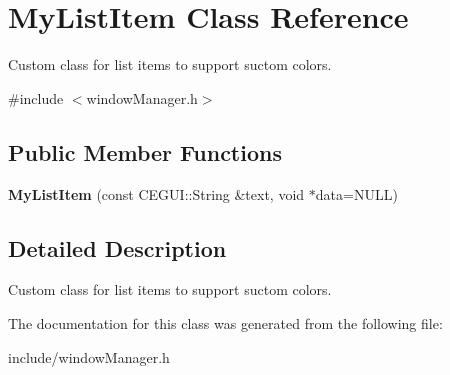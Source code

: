 \hypertarget{classMyListItem}{
\section{\-My\-List\-Item \-Class \-Reference}
\label{d9/d7a/classMyListItem}
}


\-Custom class for list items to support suctom colors.  




{\ttfamily \#include $<$window\-Manager.\-h$>$}

\subsection*{\-Public \-Member \-Functions}
\begin{DoxyCompactItemize}
\item 
\hypertarget{classMyListItem_a3d0c5c85673faf376a34e657b26d03ba}{
{\bfseries \-My\-List\-Item} (const \-C\-E\-G\-U\-I\-::\-String \&text, void $\ast$data=\-N\-U\-L\-L)}
\label{d9/d7a/classMyListItem_a3d0c5c85673faf376a34e657b26d03ba}

\end{DoxyCompactItemize}


\subsection{\-Detailed \-Description}
\-Custom class for list items to support suctom colors. 

\-The documentation for this class was generated from the following file\-:\begin{DoxyCompactItemize}
\item 
include/window\-Manager.\-h\end{DoxyCompactItemize}
